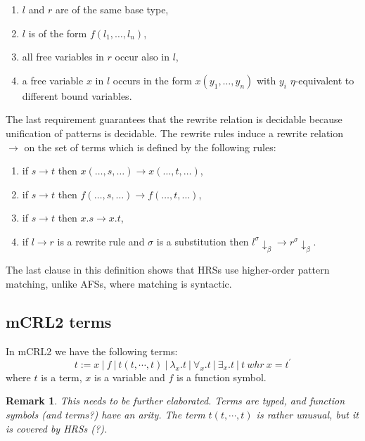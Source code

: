 \documentclass{article}
\newtheorem{remark}[theorem]{Remark}
\begin{document}
\begin{enumerate}
\item $l$ and $r$ are of the same base type,

\item $l$ is of the form $f(l_{1},\ldots ,l_{n})$,

\item all free variables in $r$ occur also in $l$,

\item a free variable $x$ in $l$ occurs in the form $x(y_{1},\ldots ,y_{n})$
with $y_{i}$ $\eta $-equivalent to different bound variables.
\end{enumerate}

The last requirement guarantees that the rewrite relation is decidable
because unification of patterns is decidable. The rewrite rules induce a
rewrite relation $\rightarrow $ on the set of terms which is defined by the
following rules:

\begin{enumerate}
\item if $s\rightarrow t$ then $x(\ldots ,s,\ldots )\rightarrow x(\ldots
,t,\ldots )$,

\item if $s\rightarrow t$ then $f(\ldots ,s,\ldots )\rightarrow f(\ldots
,t,\ldots )$,

\item if $s\rightarrow t$ then $x.s\rightarrow x.t$,

\item if $l\rightarrow r$ is a rewrite rule and $\sigma $ is a substitution
then $l^{\sigma }\downarrow _{\beta }\rightarrow r^{\sigma }\downarrow
_{\beta }$.
\end{enumerate}

The last clause in this definition shows that HRSs use higher-order pattern
matching, unlike AFSs, where matching is syntactic.

\subsection{mCRL2 terms}

In mCRL2 we have the following terms:%
\begin{equation*}
t:=x\ |\ f\ |\ t(t,\cdots ,t)\ |\ \lambda _{x}.t\ |\ \forall _{x}.t\ |\
\exists _{x}.t\ |\ t\ whr\ x=t^{\prime }
\end{equation*}%
where $t$ is a term, $x$ is a variable and $f$ is a function symbol.

\begin{remark}
This needs to be further elaborated. Terms are typed, and function symbols
(and terms?) have an arity. The term $t(t,\cdots ,t)$ is rather unusual, but
it is covered by HRSs (?).
\end{remark}
\end{document}
